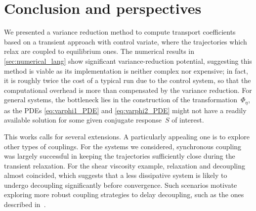 \section{Conclusion and perspectives}
\label{sec:conclusion}
%
We presented a variance reduction method to compute transport coefficients based on a transient approach with control variate, where the trajectories which relax are coupled to equilibrium ones. The numerical results in \cref{sec:numerical_lang} show significant variance-reduction potential, suggesting this method is viable as its implementation is neither complex nor expensive; in fact, it is roughly twice the cost of a typical run due to the control system, so that the computational overhead is more than compensated by the variance reduction. For general systems, the bottleneck lies in the construction of the transformation~$\Phi_\eta$, as the PDEs \eqref{eq:varphi1_PDE} and \eqref{eq:varphi2_PDE} might not have a readily available solution for some given conjugate response~$S$ of interest. 

This works calls for several extensions. A particularly appealing one is to explore other types of couplings. For the systems we considered, synchronous coupling was largely successful in keeping the trajectories sufficiently close during the transient relaxation. For the shear viscosity example, relaxation and decoupling almost coincided, which suggests that a less dissipative system is likely to undergo decoupling significantly before convergence. Such scenarios motivate exploring more robust coupling strategies to delay decoupling, such as the ones described in~\cite{guillin2012,monmarche2023a,chak2024}.